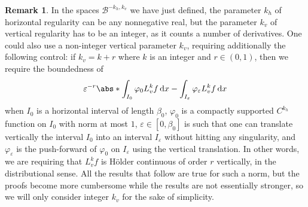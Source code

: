 \documentclass[11pt, a4paper, oneside, final, pagebackref]{amsart}
\newcommand{\boB}{\mathcal{B}}
\newcommand{\dd}{\mathop{}\!\mathrm{d}}
\renewcommand{\epsilon}{\varepsilon}
\renewcommand{\phi}{\varphi}
\theoremstyle{definition}
\newtheorem{rmk}[thm]{Remark}
\numberwithin{equation}{section}
\begin{document}
\begin{rmk}
\label{rmk:non_integers} In the spaces $\boB^{-k_h, k_v}$ we have just
defined, the parameter $k_h$ of horizontal regularity can be any nonnegative
real, but the parameter $k_v$ of vertical regularity has to be an integer, as
it counts a number of derivatives. One could also use a non-integer vertical
parameter $k_v$, requiring additionally the following control: if $k_v = k +
r$ where $k$ is an integer and $r\in(0,1)$, then we require the boundedness
of
\begin{equation*}
  \epsilon^{-r} \abs*{\int_{I_0} \phi_0 L_v^k f \dd x -\int_{I_\epsilon} \phi_\epsilon L_v^k f \dd x}
\end{equation*}
when $I_0$ is a horizontal interval of length $\beta_0$, $\phi_0$ is a
compactly supported $C^{k_h}$ function on $I_0$ with norm at most $1$,
$\epsilon\in [0,\beta_0]$ is such that one can translate vertically the
interval $I_0$ into an interval $I_\epsilon$ without hitting any singularity,
and $\phi_\epsilon$ is the push-forward of $\phi_0$ on $I_\epsilon$ using the
vertical translation. In other words, we are requiring that $L_v^k f$ is
H\"older continuous of order $r$ vertically, in the distributional sense. All
the results that follow are true for such a norm, but the proofs become more
cumbersome while the results are not essentially stronger, so we will only
consider integer $k_v$ for the sake of simplicity.
\end{rmk}
\end{document}

